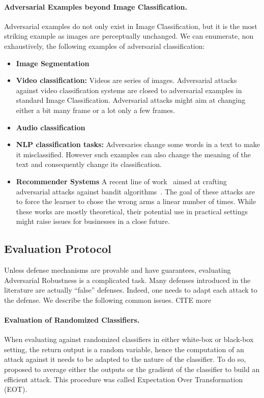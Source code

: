 \paragraph{Adversarial Examples beyond Image Classification.} Adversarial examples do not only exist in Image Classification, but it is the most striking example as images are perceptually unchanged. We can enumerate, non exhaustively, the following examples of adversarial classification:
\begin{itemize}
    \item \textbf{Image Segmentation}
    \item \textbf{Video classification:} Videos are series of images. Adversarial attacks against video classification systems are closed to adversarial examples in standard Image Classification. Adversarial attacks might aim at changing either a bit many frame or a lot only a few frames. 
    \item \textbf{Audio classification}
    \item \textbf{NLP classification tasks:} Adversaries change some words in a text to make it misclassified. However such examples can also change the meaning of the text and consequently change its classification. 
    \item \textbf{Recommender Systems} A recent line of work~\cite{xxx,garcelon2020adversarial} aimed at crafting adversarial attacks against bandit algorithms~\citep{lattimore2018bandit}. The goal of these attacks are to force the learner to chose the wrong arms a linear number of times. While these works are mostly theoretical, their potential use in practical settings might raise issues for businesses in a close future.
\end{itemize}

\subsection{Evaluation Protocol}

Unless defense mechanisms are provable and have guarantees, evaluating Adversarial Robustness is a complicated task. Many  defenses introduced in the literature are actually ``false'' defenses. Indeed, one needs to adapt each attack to the defense. We describe the following common issues. CITE more

\paragraph{Evaluation of Randomized Classifiers.} When evaluating against randomized classifiers in either white-box or black-box setting, the return output is a random variable, hence the computation of an attack against it needs to be adapted to the nature of the classifier. To do so, \cite{athalye2018obfuscated} proposed to average either the outputs or the gradient of the classifier to build an efficient attack. This procedure was called Expectation Over Transformation (EOT).

